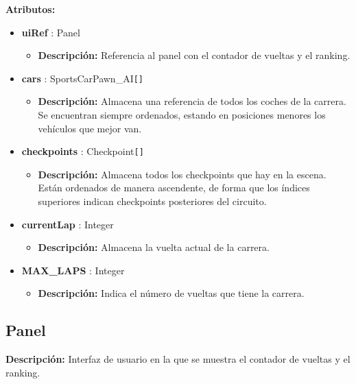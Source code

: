 \textbf{Atributos: }
\begin{itemize}
    \item \textbf{uiRef} : Panel
    \begin{itemize}
        \item \textbf{Descripción: }Referencia al panel con el contador de vueltas y el ranking.
    \end{itemize}
    
    \item \textbf{cars} : SportsCarPawn\_AI\verb|[]|
    \begin{itemize}
        \item \textbf{Descripción: }Almacena una referencia de todos los coches de la carrera. Se encuentran siempre ordenados, estando en posiciones menores los vehículos que mejor van.
    \end{itemize}

    \item \textbf{checkpoints} : Checkpoint\verb|[]|
    \begin{itemize}
        \item \textbf{Descripción: }Almacena todos los checkpoints que hay en la escena. Están ordenados de manera ascendente, de forma que los índices superiores indican checkpoints posteriores del circuito.
    \end{itemize}

    \item \textbf{currentLap} : Integer
    \begin{itemize}
        \item \textbf{Descripción: }Almacena la vuelta actual de la carrera.
    \end{itemize}

    \item \textbf{MAX\_LAPS} : Integer 
    \begin{itemize}
        \item \textbf{Descripción: }Indica el número de vueltas que tiene la carrera.
    \end{itemize}
\end{itemize}

\subsection{Panel}
\textbf{Descripción: }Interfaz de usuario en la que se muestra el contador de vueltas y el ranking.

\bigskip

